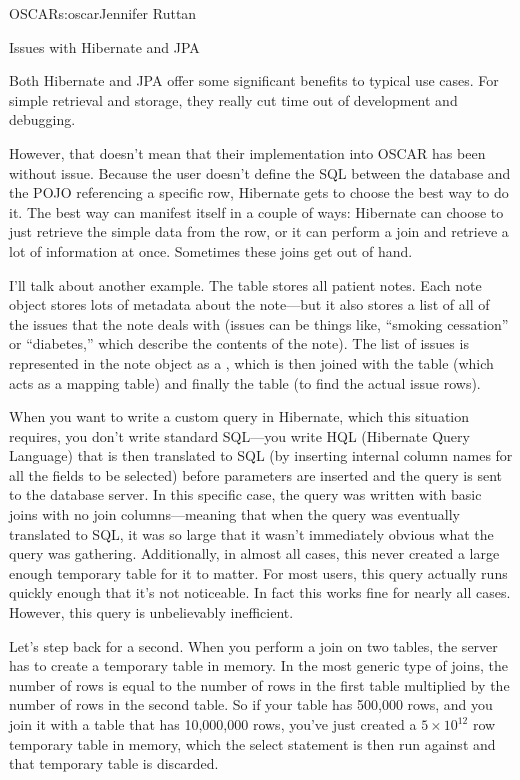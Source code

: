 \begin{aosachapter}{OSCAR}{s:oscar}{Jennifer Ruttan}
\begin{aosasect1}{Issues with Hibernate and JPA}

Both Hibernate and JPA offer some significant benefits to typical use
cases. For simple retrieval and storage, they really cut time out of
development and debugging.

However, that doesn't mean that their implementation into OSCAR has
been without issue. Because the user doesn't define the SQL between
the database and the POJO referencing a specific row, Hibernate gets
to choose the best way to do it. The best way can manifest itself in a
couple of ways: Hibernate can choose to just retrieve the simple data
from the row, or it can perform a join and retrieve a lot of
information at once. Sometimes these joins get out of hand.

I'll talk about another example. The  table
stores all patient notes. Each note object stores lots of metadata
about the note---but it also stores a list of all of the issues that
the note deals with (issues can be things like, ``smoking cessation''
or ``diabetes,'' which describe the contents of the note). The list of
issues is represented in the note object as a
, which is then
joined with the  table (which acts as a
mapping table) and finally the  table (to find
the actual issue rows).

When you want to write a custom query in Hibernate, which this
situation requires, you don't write standard SQL---you write HQL
(Hibernate Query Language) that is then translated to SQL (by
inserting internal column names for all the fields to be selected)
before parameters are inserted and the query is sent to the database
server. In this specific case, the query was written with basic joins
with no join columns---meaning that when the query was eventually
translated to SQL, it was so large that it wasn't immediately obvious
what the query was gathering. Additionally, in almost all cases, this
never created a large enough temporary table for it to matter.  
For most users, this query actually runs quickly enough that it's not
noticeable. In fact this works fine for nearly all cases. However,
this query is unbelievably inefficient.

Let's step back for a second. When you perform a join on two tables,
the server has to create a temporary table in memory. In the most
generic type of joins, the number of rows is equal to the number of
rows in the first table multiplied by the number of rows in the second
table. So if your table has 500,000 rows, and you join it with a table
that has 10,000,000 rows, you've just created a $5{\times}10^{12}$ row
temporary table in memory, which the select statement is then run against and
that temporary table is discarded.


\end{aosasect1}
\end{aosachapter}
